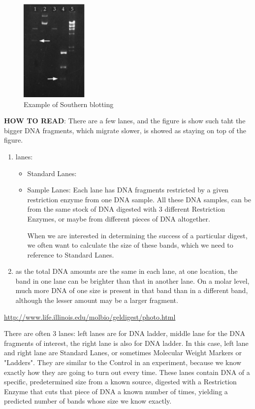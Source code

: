 \begin{figure}[hbt]
  \centerline{\includegraphics[height=5cm,
    angle=0]{./images/Southern-blotting.eps}}
  \caption{Example of Southern blotting}
\label{fig:Southern-blotting}
\end{figure}


{\bf HOW TO READ}: There are a few lanes, and the figure is show such taht the bigger DNA
fragments, which migrate slower, is showed as staying on top of the figure.
\begin{enumerate}
  \item lanes: 
  \begin{itemize}
    \item Standard Lanes:
    
    
    \item Sample Lanes:
    Each lane has DNA fragments restricted by a given restriction enzyme from
    one DNA sample. All these DNA samples, can be from the same stock of DNA
    digested with 3 different Restriction Enzymes, or maybe from different
    pieces of DNA altogether.
    
     When we are interested in determining the success of a particular digest,
    we often want to calculate the size of these bands, which we need to
    reference to Standard Lanes.
  \end{itemize}
  
  \item as the total DNA amounts are the same in each lane, 
  at one location, the band in one lane can be brighter than that in another
  lane. On a molar level, much more DNA of one size is present in that band than
  in a different band, although the lesser amount may be a larger fragment.
  
  
\end{enumerate}
\url{http://www.life.illinois.edu/molbio/geldigest/photo.html}



 
  There are often 3 lanes: left lanes are for DNA ladder, middle lane for the
  DNA fragments of interest, the right lane is also for DNA ladder.
  In this case, left lane and right lane are Standard Lanes, or sometimes
  Molecular Weight Markers or "Ladders". They are similar to the Control in an
  experiment, because we know exactly how they are going to turn out every time.
  These lanes contain DNA of a specific, predetermined size from a known source,
  digested with a Restriction Enzyme that cuts that piece of DNA a known number
  of times, yielding a predicted number of bands whose size we know exactly.
  
